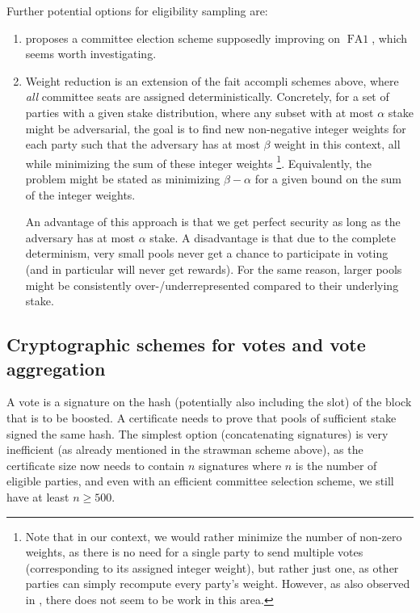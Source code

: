 Further potential options for eligibility sampling are:
\begin{enumerate}
\item
  \cite{alpenglow} proposes a committee election scheme supposedly improving on $\operatorname{FA1}$, which seems worth investigating.
\item
  Weight reduction \parencite{tonkikh2024swiper,cryptoeprint:2025/1076} is an extension of the fait accompli schemes above, where \emph{all} committee seats are assigned deterministically.
  Concretely, for a set of parties with a given stake distribution, where any subset with at most $\alpha$ stake might be adversarial, the goal is to find new non-negative integer weights for each party such that the adversary has at most $\beta$ weight in this context, all while minimizing the sum of these integer weights%
  \footnote{Note that in our context, we would rather minimize the number of non-zero weights, as there is no need for a single party to send multiple votes (corresponding to its assigned integer weight), but rather just one, as other parties can simply recompute every party's weight. However, as also observed in \cite{cryptoeprint:2025/1076}, there does not seem to be work in this area.}.
  Equivalently, the problem might be stated as minimizing $\beta-\alpha$ for a given bound on the sum of the integer weights.

  An advantage of this approach is that we get perfect security as long as the adversary has at most $\alpha$ stake.
  A disadvantage is that due to the complete determinism, very small pools never get a chance to participate in voting (and in particular will never get rewards).
  For the same reason, larger pools might be consistently over-/underrepresented compared to their underlying stake.
\end{enumerate}

\subsection{Cryptographic schemes for votes and vote aggregation}

A vote is a signature on the hash (potentially also including the slot) of the block that is to be boosted.
A certificate needs to prove that pools of sufficient stake signed the same hash.
The simplest option (concatenating signatures) is very inefficient (as already mentioned in the strawman scheme above), as the certificate size now needs to contain $n$ signatures where $n$ is the number of eligible parties, and even with an efficient committee selection scheme, we still have at least $n\ge 500$.

